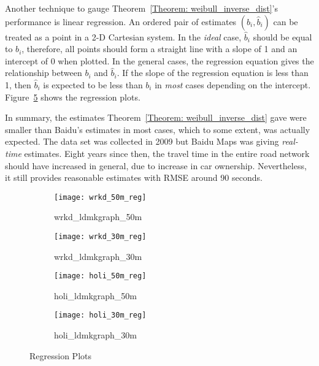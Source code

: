 Another technique to gauge Theorem~\ref{Theorem: weibull_inverse_dist}'s performance is linear regression. An ordered pair of estimates $(b_{i}, \hat{b}_{i})$ can be treated as a point in a 2-D Cartesian system. In the \emph{ideal} case, $\hat{b}_{i}$ should be equal to $b_{i}$, therefore, all points should form a straight line with a slope of 1 and an intercept of 0 when plotted. In the general cases, the regression equation gives the relationship between $b_{i}$ and $\hat{b}_{i}$. If the slope of the regression equation is less than 1, then $\hat{b}_{i}$ is expected to be less than $b_{i}$ in \emph{most} cases depending on the intercept. Figure~\ref{Fig:regression_plot} shows the regression plots. 

In summary, the estimates Theorem~\ref{Theorem: weibull_inverse_dist} gave were smaller than Baidu's estimates in most cases, which to some extent, was actually expected. The data set was collected in 2009 but Baidu Maps was giving \emph{real-time} estimates. Eight years since then, the travel time in the entire road network should have increased in general, due to increase in car ownership. Nevertheless, it still provides reasonable estimates with RMSE around 90 seconds. 

\begin{figure}[h!]
\begin{subfigure}{.5\textwidth}
\centering
\texttt{[image: wrkd\_50m\_reg]}
\caption{wrkd\_ldmkgraph\_50m}
\label{Fig:wrkd_50m_reg}
\end{subfigure}
\begin{subfigure}{.5\textwidth}
\centering
\texttt{[image: wrkd\_30m\_reg]}
\caption{wrkd\_ldmkgraph\_30m}
\label{Fig:wrkd_30m_reg}
\end{subfigure}

\begin{subfigure}{.5\textwidth}
\centering
\texttt{[image: holi\_50m\_reg]}
\caption{holi\_ldmkgraph\_50m}
\label{Fig:holi_50m_reg}
\end{subfigure}
\begin{subfigure}{.5\textwidth}
\centering
\texttt{[image: holi\_30m\_reg]}
\caption{holi\_ldmkgraph\_30m}
\label{Fig:holi_30m_reg}
\end{subfigure}

\caption{Regression Plots}
\label{Fig:regression_plot}
\end{figure}


